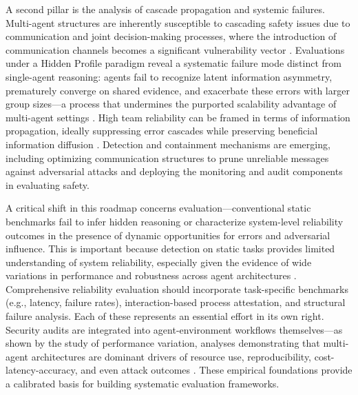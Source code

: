 \documentclass[11pt,a4paper]{article}
\begin{document}
A second pillar is the analysis of cascade propagation and systemic failures. Multi-agent structures are inherently susceptible to cascading safety issues due to communication and joint decision-making processes, where the introduction of communication channels becomes a significant vulnerability vector \cite{arxiv:2307.06187v1}. Evaluations under a Hidden Profile paradigm reveal a systematic failure mode distinct from single-agent reasoning: agents fail to recognize latent information asymmetry, prematurely converge on shared evidence, and exacerbate these errors with larger group sizes---a process that undermines the purported scalability advantage of multi-agent settings \cite{arxiv:2505.11556v4}. High team reliability can be framed in terms of information propagation, ideally suppressing error cascades while preserving beneficial information diffusion \cite{arxiv:2505.23352v1}. Detection and containment mechanisms are emerging, including optimizing communication structures to prune unreliable messages against adversarial attacks \cite{arxiv:2410.02506v1} and deploying the monitoring and audit components in evaluating safety.

A critical shift in this roadmap concerns evaluation---conventional static benchmarks fail to infer hidden reasoning or characterize system-level reliability outcomes in the presence of dynamic opportunities for errors and adversarial influence. This is important because detection on static tasks provides limited understanding of system reliability, especially given the evidence of wide variations in performance and robustness across agent architectures \cite{arxiv:2601.00481v1}. Comprehensive reliability evaluation should incorporate task-specific benchmarks (e.g., latency, failure rates), interaction-based process attestation, and structural failure analysis. Each of these represents an essential effort in its own right. Security audits are integrated into agent-environment workflows themselves---as shown by the study of performance variation, analyses demonstrating that multi-agent architectures are dominant drivers of resource use, reproducibility, cost-latency-accuracy, and even attack outcomes \cite{arxiv:2601.00481v1}. These empirical foundations provide a calibrated basis for building systematic evaluation frameworks.
\end{document}
